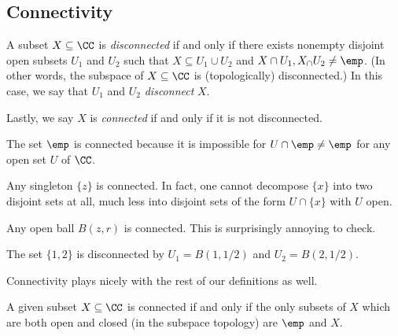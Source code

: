 \subsection{Connectivity}
\begin{definition}[Disconnected]
	A subset $X\subseteq\CC$ is \textit{disconnected} if and only if there exists nonempty disjoint open subsets $U_1$ and $U_2$ such that $X\subseteq U_1\cup U_2$ and $X\cap U_1,X_\cap U_2\ne\emp$. (In other words, the subspace of $X\subseteq\CC$ is (topologically) disconnected.) In this case, we say that $U_1$ and $U_2$ \textit{disconnect} $X$.

	Lastly, we say $X$ is \textit{connected} if and only if it is not disconnected.
\end{definition}
\begin{example}
	The set $\emp$ is connected because it is impossible for $U\cap\emp\ne\emp$ for any open set $U$ of $\CC$.
\end{example}
\begin{example}
	Any singleton $\{z\}$ is connected. In fact, one cannot decompose $\{x\}$ into two disjoint sets at all, much less into disjoint sets of the form $U\cap\{x\}$ with $U$ open.
\end{example}
\begin{ex}
	Any open ball $B(z,r)$ is connected. This is surprisingly annoying to check. %
\end{ex}
\begin{example}
	The set $\{1,2\}$ is disconnected by $U_1=B(1,1/2)$ and $U_2=B(2,1/2)$.
\end{example}
Connectivity plays nicely with the rest of our definitions as well.
\begin{lemma}
	A given subset $X\subseteq\CC$ is connected if and only if the only subsets of $X$ which are both open and closed (in the subspace topology) are $\emp$ and $X$.
\end{lemma}
